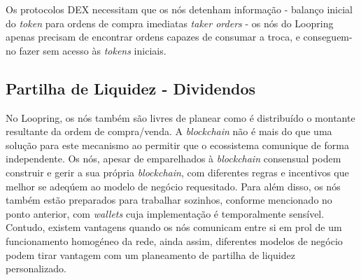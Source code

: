 \documentclass[UTF8,nofonts]{article}
\begin{document}
\begin{multicols}{2}
Os protocolos DEX necessitam que os nós detenham informação - balanço inicial do \textit{token} para ordens de compra imediatas \textit{taker orders} - os nós do Loopring apenas precisam de encontrar ordens capazes de consumar a troca, e conseguem-no fazer sem acesso às \textit{tokens} iniciais.





\subsection{Partilha de Liquidez - Dividendos\label{sec:liquidity_sharing}}

No Loopring, os nós também são livres de planear como é distribuído o montante resultante da ordem de compra/venda. A \textit{blockchain} não é mais do que uma solução para este mecanismo ao permitir que o ecossistema comunique de forma independente. Os nós, apesar de emparelhados à \textit{blockchain} consensual podem construir e gerir a sua própria \textit{blockchain}, com diferentes regras e incentivos que melhor se adeqúem ao modelo de negócio requesitado. Para além disso, os nós também estão preparados para trabalhar sozinhos, conforme mencionado no ponto anterior, com \textit{wallets} cuja implementação é temporalmente sensível. Contudo, existem vantagens quando os nós comunicam entre si em prol de um funcionamento homogéneo da rede, ainda assim, diferentes modelos de negócio podem tirar vantagem com um planeamento de partilha de liquidez personalizado.


\end{multicols}
\end{document}
